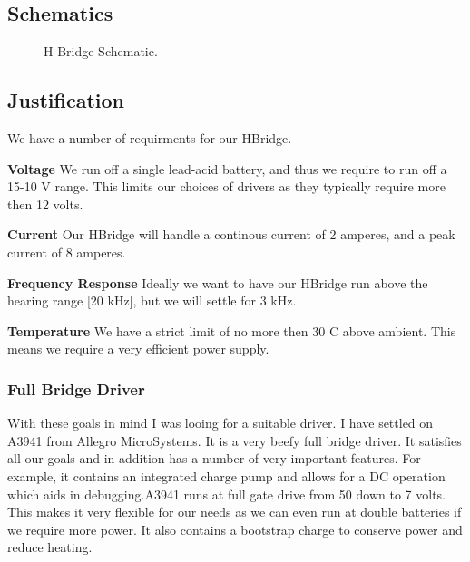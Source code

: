 \documentclass[12pt]{article}
\newcommand{\figuremine}[2]{
\begin{figure}[H]
\noindent\makebox[\textwidth]{
 \texttt{[image: \#1]}}
 \caption{#2}
\end{figure}
}
\begin{document}
\subsection{Schematics}
\figuremine{~/ece445/Chalk-Bot/Hardware/H_Bridge/page1.png}{H-Bridge Schematic.}
\subsection{Justification}
We have a number of requirments for our HBridge.
\begin{description}
\item{\bf Voltage} We run off a single lead-acid battery, and thus we require to run off a 15-10 V range. This limits our choices of drivers as they typically require more then 12 volts.
\item{\bf Current} Our HBridge will handle a continous current of 2 amperes, and a peak current of 8 amperes.
\item{\bf Frequency Response} Ideally we want to have our HBridge run above the hearing range [20 kHz], but we will settle for 3 kHz.
\item{\bf Temperature} We have a strict limit of no more then 30 C above ambient. This means we require a very efficient power supply.
\end{description}
\subsubsection{Full Bridge Driver}
With these goals in mind I was looing for a suitable driver. I have settled on A3941 from Allegro MicroSystems. It is a very beefy full bridge driver. It satisfies all our goals and in addition has a number of very important features. For example, it contains an integrated charge pump and allows for a DC operation which aids in debugging.A3941 runs at full gate drive from 50 down to 7 volts. This makes it very flexible for our needs as we can even run at double batteries if we require more power.  It also contains a bootstrap charge to conserve power and reduce heating.
\end{document}
